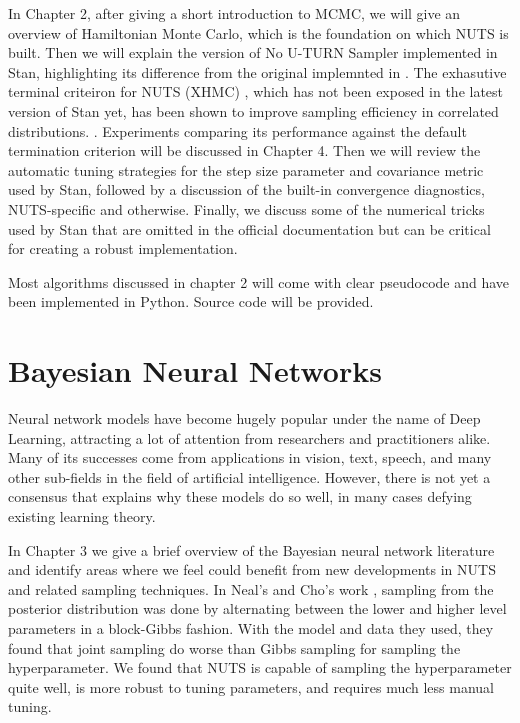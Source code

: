 \documentclass[12pt]{report}
\begin{document}
In Chapter 2, after giving a short introduction to MCMC, we will give an overview of Hamiltonian Monte Carlo, which is the foundation on which NUTS is built. Then we will explain the version of No U-TURN Sampler implemented in Stan, highlighting its difference from the original implemnted in \cite{hoffman2014no}. The exhasutive terminal criteiron for NUTS (XHMC) , which has not been exposed in the latest version of Stan yet, has been shown to improve sampling efficiency in correlated distributions.  \cite{betancourt2016identifying}. Experiments comparing its performance against the default termination criterion will be discussed in Chapter 4. Then we will review the automatic tuning strategies for the step size parameter and covariance metric used by Stan, followed by a discussion of the built-in convergence diagnostics, NUTS-specific and otherwise.
Finally, we discuss some of the numerical tricks used by Stan that are omitted in the official documentation but can be critical for creating a robust implementation. 

Most algorithms discussed in chapter 2 will come with clear pseudocode and have been implemented in Python. Source code will be provided.

\section{Bayesian Neural Networks}

Neural network models have become hugely popular under the name of Deep Learning, attracting a lot of attention from researchers and practitioners alike. Many of its successes come from applications in vision, text, speech, and many other sub-fields in the field of artificial intelligence. However, there is not yet a consensus that explains why these models do so well, in many cases defying existing learning theory. 


In Chapter 3 we give a brief overview of the Bayesian neural network literature and identify areas where we feel could benefit from new developments in NUTS and related sampling techniques. In Neal's and Cho's work \cite{neal1993bayesian,choo2000learning}, sampling from the posterior distribution was done by alternating between the lower and higher level parameters in a block-Gibbs fashion. With the model and data they used, they found that joint sampling do worse than Gibbs sampling for sampling the hyperparameter. We found that NUTS is capable of sampling the hyperparameter quite well, is more robust to tuning parameters, and requires much less manual tuning. 
\end{document}
